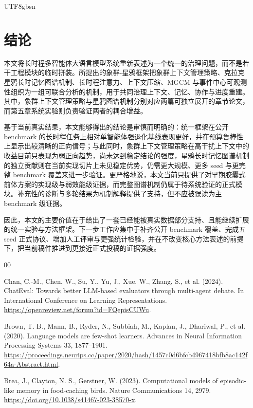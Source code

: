 \documentclass[a4paper,fleqn]{cas-sc}
\begin{document}
\begin{CJK*}{UTF8}{gbsn}
\section{结论}

本文将长时程多智能体大语言模型系统重新表述为一个统一的治理问题，而不是若干工程模块的临时拼装。所提出的象群-星鸦框架把象群上下文管理策略、克拉克星鸦长时记忆图谱机制、长时程注意力、上下文压缩、MGCM 与事件中心可观测性组织为一组可联合分析的机制，用于共同治理上下文、记忆、协作与进度重建。其中，象群上下文管理策略与星鸦图谱机制分别对应两篇可独立展开的章节论文，而第五章系统实验则负责验证两者的耦合增益。

基于当前真实结果，本文能够得出的结论是审慎而明确的：统一框架在公开 benchmark 的长时程任务上相对单智能体强退化基线表现更好，并在预算鲁棒性上显示出较清晰的正向信号；与此同时，象群上下文管理策略在高干扰上下文中的收益目前只表现为弱正向趋势，尚未达到稳定结论的强度，星鸦长时记忆图谱机制的独立贡献则在当前实现切片上未见稳定优势，仍需更大规模、更多 seed 与更完整 benchmark 覆盖来进一步验证。更严格地说，本文当前只提供了对早期胶囊式前体方案的实现级与弱效能级证据，而完整图谱机制仍属于待系统验证的正式模块。补充性的诊断与多轮结果为机制解释提供了支持，但不应被误读为主 benchmark 级证据。

因此，本文的主要价值在于给出了一套已经能被真实数据部分支持、且能继续扩展的统一实验与方法框架。下一步工作应集中于补齐公开 benchmark 覆盖、完成五 seed 正式协议、增加人工评审与更强统计检验，并在不改变核心方法表述的前提下，把当前稿件推进到更接近正式投稿的证据强度。

\begin{thebibliography}{00}

Chan, C.-M., Chen, W., Su, Y., Yu, J., Xue, W., Zhang, S., et al. (2024). ChatEval: Towards better LLM-based evaluators through multi-agent debate. In International Conference on Learning Representations. \url{https://openreview.net/forum?id=FQepisCUWu}.

Brown, T. B., Mann, B., Ryder, N., Subbiah, M., Kaplan, J., Dhariwal, P., et al. (2020). Language models are few-shot learners. Advances in Neural Information Processing Systems 33, 1877--1901. \url{https://proceedings.neurips.cc/paper/2020/hash/1457c0d6bfcb4967418bfb8ac142f64a-Abstract.html}.

Brea, J., Clayton, N. S., Gerstner, W. (2023). Computational models of episodic-like memory in food-caching birds. Nature Communications 14, 2979. \url{https://doi.org/10.1038/s41467-023-38570-x}.


\end{thebibliography}
\end{CJK*}
\end{document}
